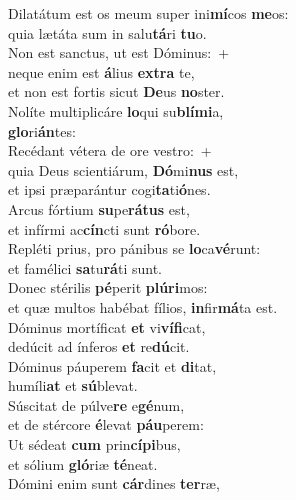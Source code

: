 \evenverse Dilatátum est os meum super ini\textbf{mí}cos \textbf{me}os:~\*\\
\evenverse quia lætáta sum in salu\textbf{tá}ri \textbf{tu}o.\\
\oddverse Non est sanctus, ut est Dóminus:~+\\
\oddverse  neque enim est \textbf{á}lius \textbf{ex}\textbf{tra} te,~\*\\
\oddverse et non est fortis sicut \textbf{De}us \textbf{no}ster.\\
\evenverse Nolíte multiplicáre \textbf{lo}qui su\textbf{blí}\textbf{mi}a,~\*\\
\evenverse \textbf{glo}ri\textbf{án}tes:\\
\oddverse Recédant vétera de ore vestro:~+\\
\oddverse  quia Deus scientiárum, \textbf{Dó}mi\textbf{nus} est,~\*\\
\oddverse et ipsi præparántur cogi\textbf{ta}ti\textbf{ó}nes.\\
\evenverse Arcus fórtium \textbf{su}pe\textbf{rá}\textbf{tus} est,~\*\\
\evenverse et infírmi ac\textbf{cín}cti sunt \textbf{ró}bore.\\
\oddverse Repléti prius, pro pánibus se \textbf{lo}ca\textbf{vé}runt:~\*\\
\oddverse et famélici \textbf{sa}tu\textbf{rá}ti sunt.\\
\evenverse Donec stérilis \textbf{pé}perit \textbf{plú}\textbf{ri}mos:~\*\\
\evenverse et quæ multos habébat fílios, \textbf{in}fir\textbf{má}ta est.\\
\oddverse Dóminus mortíficat \textbf{et} vi\textbf{ví}\textbf{fi}cat,~\*\\
\oddverse dedúcit ad ínferos \textbf{et} re\textbf{dú}cit.\\
\evenverse Dóminus páuperem \textbf{fa}cit et \textbf{di}tat,~\*\\
\evenverse humíli\textbf{at} et \textbf{sú}blevat.\\
\oddverse Súscitat de púlve\textbf{re} e\textbf{gé}num,~\*\\
\oddverse et de stércore \textbf{é}levat \textbf{páu}perem:\\
\evenverse Ut sédeat \textbf{cum} prin\textbf{cí}\textbf{pi}bus,~\*\\
\evenverse et sólium \textbf{gló}riæ \textbf{té}neat.\\
\oddverse Dómini enim sunt \textbf{cár}dines \textbf{ter}ræ,~\*\\
